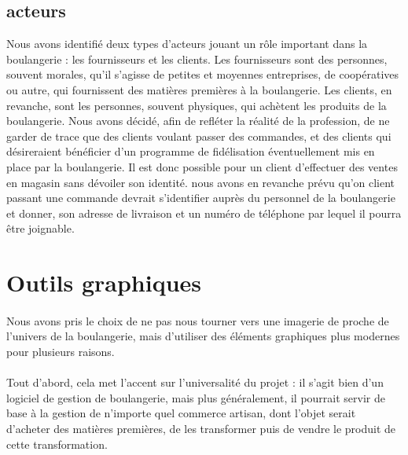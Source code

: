     \subsection{acteurs}
        Nous avons identifié deux types d'acteurs jouant un rôle important dans
        la boulangerie : les fournisseurs et les clients.
        Les fournisseurs sont des personnes, souvent morales, qu'il s'agisse
        de petites et moyennes entreprises, de coopératives ou autre, qui
        fournissent des matières premières à la boulangerie.
        Les clients, en revanche, sont les personnes, souvent physiques, qui
        achètent les produits de la boulangerie.
        Nous avons décidé, afin de refléter la réalité de la profession, de 
        ne garder de trace que des clients voulant passer des commandes, et des
        clients qui désireraient bénéficier d'un programme de fidélisation
        éventuellement mis en place par la boulangerie.
        Il est donc possible pour un client d'effectuer des ventes en magasin
        sans dévoiler son identité.
        nous avons en revanche prévu qu'on client passant une commande devrait
        s'identifier auprès du personnel de la boulangerie et donner, son
        adresse de livraison et un numéro de téléphone par lequel il pourra être
        joignable.



\section{Outils graphiques}
    \paragraph{}
        Nous avons pris le choix de ne pas nous tourner vers une imagerie de
        proche de l'univers de la boulangerie, mais d'utiliser des éléments
        graphiques plus modernes pour plusieurs raisons.
    \paragraph{}
        Tout d'abord, cela met l'accent sur l'universalité du projet :
        il s'agit bien d'un logiciel de gestion de boulangerie, mais plus
        généralement, il pourrait servir de base à la gestion de n'importe
        quel commerce artisan, dont l'objet serait d'acheter des matières
        premières, de les transformer puis de vendre le produit de cette
        transformation.
